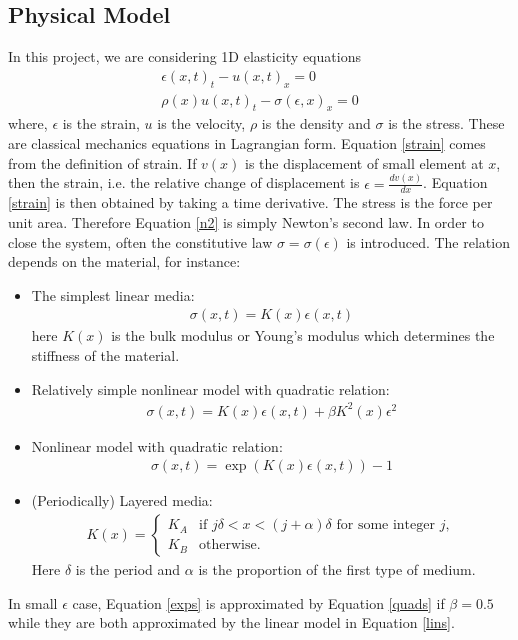 \documentclass{article}
\begin{document}
\subsection{Physical Model}
In this project, we are considering 1D elasticity equations
\begin{align}
\epsilon(x,t)_t-u(x,t)_x=0 \label{strain}\\
\rho(x) u(x,t)_t-\sigma(\epsilon,x)_x=0 \label{n2}
\end{align}
where, $\epsilon$ is the strain, $u$ is the velocity, $\rho$ is the density and $\sigma$ is the stress. These are classical mechanics equations in Lagrangian form. Equation \eqref{strain} comes from the definition of strain. If $v(x)$ is the displacement of small element at $x$, then the strain, i.e. the relative change of displacement is $\epsilon=\frac{dv(x)}{dx}$. Equation \eqref{strain} is then obtained by taking a time derivative. The stress is the force per unit area. Therefore Equation \eqref{n2} is simply Newton's second law. In order to close the system, often the constitutive law $\sigma=\sigma(\epsilon)$ is introduced. The relation depends on the material, for instance:
\begin{itemize}
\item The simplest linear media:
\begin{align}
\sigma(x,t)=K(x)\epsilon(x,t)
\label{lins}
\end{align}
here $K(x)$ is the bulk modulus or Young's modulus which determines the stiffness of the material.
\item Relatively simple nonlinear model with quadratic relation:
\begin{align}
\sigma(x,t)=K(x)\epsilon(x,t)+\beta K^2(x)\epsilon^2
\label{quads}
\end{align}
\item Nonlinear model with quadratic relation:
\begin{align}
\sigma(x,t)=\exp(K(x)\epsilon(x,t))-1
\label{exps}
\end{align}
\item (Periodically) Layered media:
\begin{align}
K(x)=\left\{
\begin{array}{cc}
K_A & \mbox{if }j\delta<x<(j+\alpha)\delta \mbox{ for some integer } j,\\
K_B & \mbox{otherwise.}
\end{array}
\right.
\end{align}
Here $\delta$ is the period and $\alpha$ is the proportion of the first type of medium. 
\end{itemize}
In small $\epsilon$ case, Equation \eqref{exps} is approximated by Equation \eqref{quads} if $\beta=0.5$ while they are both approximated by the linear model in Equation \eqref{lins}.
\end{document}

